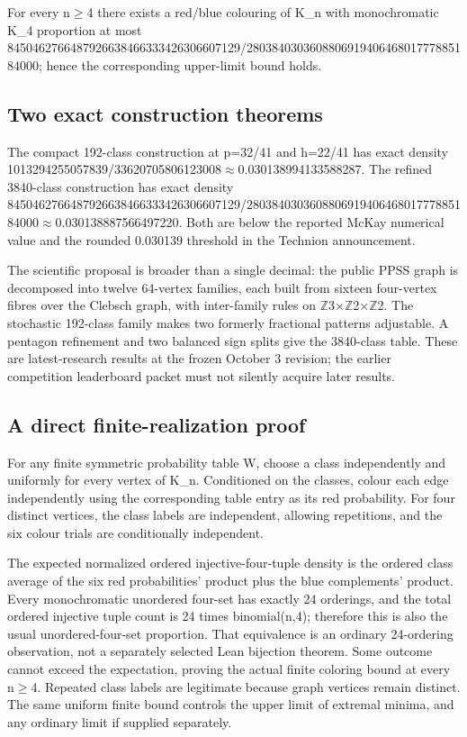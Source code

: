 \documentclass[11pt,a4paper]{article}
\begin{document}
For every n\ensuremath{\geq}4 there exists a red/blue colouring of K\_n with monochromatic K\_4 proportion at most 8450462766487926638466333426306607129/280384030360880691940646801777885184000; hence the corresponding upper-limit bound holds.

\subsection{Two exact construction theorems}
The compact 192-class construction at p=32/41 and h=22/41 has exact density 1013294255057839/33620705806123008\ensuremath{\approx}0.030138994133588287. The refined 3840-class construction has exact density 8450462766487926638466333426306607129/280384030360880691940646801777885184000\ensuremath{\approx}0.030138887566497220. Both are below the reported McKay numerical value and the rounded 0.030139 threshold in the Technion announcement.

The scientific proposal is broader than a single decimal: the public PPSS graph is decomposed into twelve 64-vertex families, each built from sixteen four-vertex fibres over the Clebsch graph, with inter-family rules on \ensuremath{\mathbb{Z}}3\ensuremath{\times}\ensuremath{\mathbb{Z}}2\ensuremath{\times}\ensuremath{\mathbb{Z}}2. The stochastic 192-class family makes two formerly fractional patterns adjustable. A pentagon refinement and two balanced sign splits give the 3840-class table. These are latest-research results at the frozen October 3 revision; the earlier competition leaderboard packet must not silently acquire later results.

\subsection{A direct finite-realization proof}
For any finite symmetric probability table W, choose a class independently and uniformly for every vertex of K\_n. Conditioned on the classes, colour each edge independently using the corresponding table entry as its red probability. For four distinct vertices, the class labels are independent, allowing repetitions, and the six colour trials are conditionally independent.

The expected normalized ordered injective-four-tuple density is the ordered class average of the six red probabilities' product plus the blue complements' product. Every monochromatic unordered four-set has exactly 24 orderings, and the total ordered injective tuple count is 24 times binomial(n,4); therefore this is also the usual unordered-four-set proportion. That equivalence is an ordinary 24-ordering observation, not a separately selected Lean bijection theorem. Some outcome cannot exceed the expectation, proving the actual finite coloring bound at every n\ensuremath{\geq}4. Repeated class labels are legitimate because graph vertices remain distinct. The same uniform finite bound controls the upper limit of extremal minima, and any ordinary limit if supplied separately.
\end{document}
